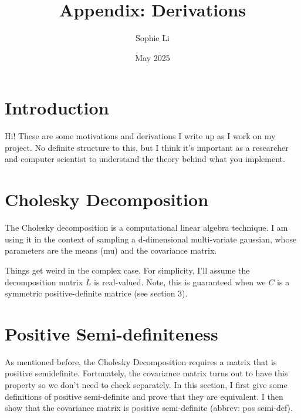 \documentclass{article}
\title{Appendix: Derivations}
\author{Sophie Li }
\date{May 2025}
\begin{document}
\maketitle

\section{Introduction}
Hi! These are some motivations and derivations I write up as I work on my project. No definite structure to this, but I think it's important as a researcher and computer scientist to understand the theory behind what you implement. 

\section{Cholesky Decomposition}
The Cholesky decomposition is a computational linear algebra technique. I am using it in the context of sampling a d-dimensional multi-variate gaussian, whose parameters are the means (mu) and the covariance matrix. 

Things get weird in the complex case. For simplicity, I'll assume the decomposition matrix $L$ is real-valued. Note, this is guaranteed when we $C$ is a symmetric positive-definite matrice (see section 3). 

\section{Positive Semi-definiteness}
As mentioned before, the Cholesky Decomposition requires a matrix that is positive semidefinite. Fortunately, the covariance matrix turns out to have this property so we don't need to check separately. 
In this section, I first give some definitions of positive semi-definite and prove that they are equivalent. 
\newline
I then show that the covariance matrix is positive semi-definite (abbrev: pos semi-def). 
\end{document}
